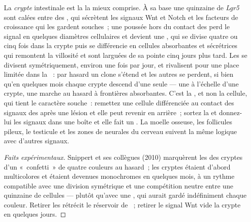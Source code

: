 \begin{proposition}\label{prop:b3:stem-cells:crypt}
La \emph{crypte} intestinale est la  la mieux comprise. À sa base
une quinzaine de  \emph{Lgr5} sont calées entre des
, qui sécrètent les signaux Wnt et Notch et les
facteurs de croissance qui les gardent souches~; une 
poussée hors du contact des  perd le signal en
quelques diamètres cellulaires et devient une , qui se divise quatre ou cinq fois dans la crypte puis se
différencie en cellules absorbantes et sécrétrices qui remontent la
villosité et sont larguées de sa pointe cinq jours plus tard. Les
 se divisent symétriquement, environ une fois par jour,
et rivalisent pour une place limitée dans la ~: par hasard un clone
s'étend et les autres se perdent, si bien qu'en quelques mois chaque
crypte descend d'une seule  --- une \emph{} à
l'échelle d'une crypte, une marche au hasard à frontières absorbantes.
C'est la , et non la cellule, qui tient le caractère souche~:
remettez une cellule différenciée au contact des signaux des  après une lésion et elle peut revenir en arrière~; sortez la
 et donnez-lui les signaux dans une boîte et elle fait un
. La moelle osseuse, les follicules pileux, le testicule et les
zones de  neurales du cerveau suivent la même logique
avec d'autres signaux.
\end{proposition}
\begin{proof}[Faits expérimentaux]
Snippert et ses collègues (2010) marquèrent les  des
cryptes d'un «~confetti~» de quatre couleurs au hasard~; les cryptes
étaient d'abord multicolores et étaient devenues monochromes en quelques
mois, à un rythme compatible avec une division symétrique et une
compétition neutre entre une quinzaine de cellules --- plutôt qu'avec
une , qui aurait gardé indéfiniment chaque couleur.
Retirer les  rétrécit le réservoir de ~; retirer le signal Wnt vide la crypte en quelques jours.
\end{proof}

